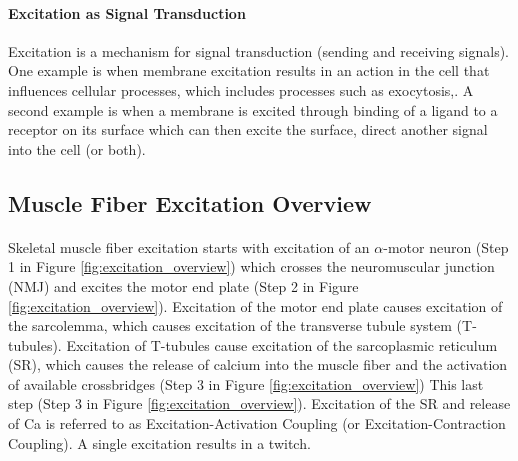 \paragraph{Excitation as Signal Transduction}
Excitation is a mechanism for signal transduction (sending and receiving signals). One example is when membrane excitation results in an action in the cell that influences cellular processes, which includes processes such as exocytosis,\footnotemark{}. A second example is when a membrane is excited through binding of a ligand\footnotemark{} to a receptor on its surface which can then excite the surface, direct another signal into the cell (or both). 

\subsection{Muscle Fiber Excitation Overview}
\paragraph{}

Skeletal muscle fiber excitation starts with excitation of an $\alpha$-motor neuron (Step 1 in Figure \ref{fig:excitation_overview}) which crosses the neuromuscular junction (NMJ) and excites the motor end plate (Step 2 in Figure \ref{fig:excitation_overview}). Excitation of the motor end plate causes excitation of the sarcolemma, which causes excitation of the transverse tubule system (T-tubules). Excitation of T-tubules cause excitation of the sarcoplasmic reticulum (SR), which causes the release of calcium into the muscle fiber and the activation of available crossbridges (Step 3 in Figure \ref{fig:excitation_overview}) This last step (Step 3 in Figure \ref{fig:excitation_overview}). Excitation of the SR and release of Ca is referred to as Excitation-Activation Coupling (or Excitation-Contraction Coupling). A single excitation results in a twitch.

